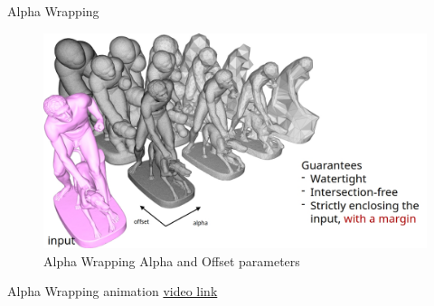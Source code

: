\documentclass[10pt]{beamer}
\begin{document}
\begin{frame}{Alpha Wrapping}
  \begin{figure}[H]
    \centering
    \includegraphics[width=1.1\textwidth]{images/alpha-wrapping4.jpg}
    \caption{Alpha Wrapping Alpha and Offset parameters}
\end{figure}
\end{frame}

\begin{frame}{Alpha Wrapping animation}
  \href{https://youtu.be/xIIDolWCrgU}{video link}
  \begin{center}
\end{center}
\end{frame}
\end{document}

